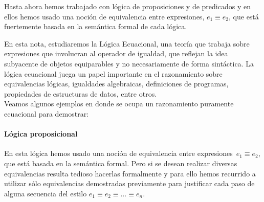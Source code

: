\documentclass[11pt,letterpaper]{article}
\begin{document}
% 
% 
% 


Hasta ahora hemos trabajado con l\'ogica de proposiciones y de predicados
y en ellos hemos usado una noci\'on de equivalencia entre expresiones, 
$e_1 \equiv e_2$, que est\'a fuertemente basada en la sem\'antica formal de 
cada l\'ogica.


 
En esta nota, estudiaremos la Lógica Ecuacional, 
una teoría que trabaja sobre expresiones que involucran al operador de 
igualdad, que reflejan la idea subyacente de objetos equiparables y no 
necesariamente de forma sint\'actica. 
La lógica ecuacional juega un papel importante en el razonamiento sobre 
equivalencias lógicas, igualdades algebraicas, definiciones de programas, 
propiedades de estructuras de datos, entre otros.  \\
Veamos algunos ejemplos en donde se ocupa un razonamiento puramente 
ecuacional para demostrar:


\paragraph{L\'ogica proposicional}
En esta lógica hemos usado una noci\'on de equivalencia entre 
expresiones~$e_1 \equiv e_2$, que est\'a  basada en la sem\'antica formal. 
Pero si se desean realizar diversas equivalencias resulta tedioso hacerlas 
formalmente y para ello hemos recurrido a utilizar s\'olo equivalencias 
demostradas previamente para justificar cada paso de alguna secuencia
del estilo $e_1 \equiv e_2 \equiv \ldots \equiv e_n$.\\
\end{document}
